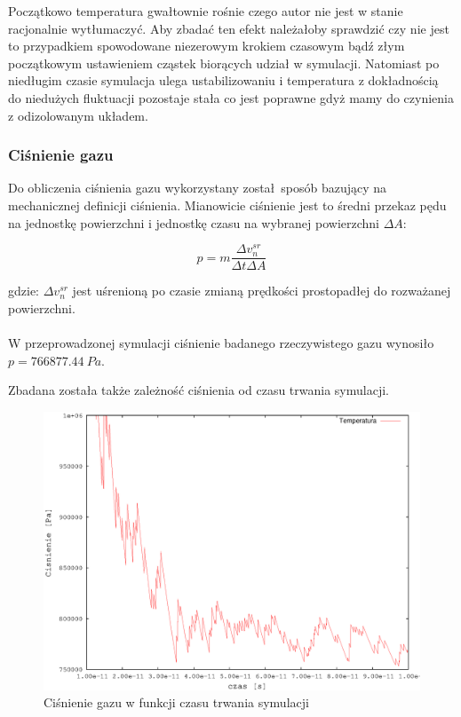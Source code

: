 \documentclass[a4paper,10pt]{article}
\begin{document}
Początkowo temperatura gwałtownie rośnie czego autor nie jest w stanie racjonalnie wytłumaczyć. Aby zbadać ten efekt należałoby sprawdzić czy nie jest to przypadkiem spowodowane niezerowym krokiem czasowym bądź złym początkowym ustawieniem cząstek biorących udział w symulacji. Natomiast po niedługim czasie symulacja ulega ustabilizowaniu i temperatura z dokładnością do niedużych fluktuacji pozostaje stała co jest poprawne gdyż mamy do czynienia z odizolowanym układem.

\subsubsection{Ciśnienie gazu}

Do obliczenia ciśnienia gazu wykorzystany został sposób bazujący na mechanicznej definicji ciśnienia. Mianowicie ciśnienie jest to średni przekaz pędu na jednostkę powierzchni i jednostkę czasu na wybranej powierzchni $\Delta A$:

\begin{equation}\label{cisnienie:1}
p = m \frac{\Delta v_n^{sr}}{\Delta t \Delta A}
\end{equation}

gdzie: $\Delta v_n^{sr}$ jest uśrenioną po czasie zmianą prędkości prostopadłej do rozważanej powierzchni.
\\
\\
W przeprowadzonej symulacji ciśnienie badanego rzeczywistego gazu wynosiło $p=766877.44\ Pa$.

Zbadana została także zależność ciśnienia od czasu trwania symulacji.

\begin{figure}[h]
\begin{center}
\includegraphics[scale=0.6]{wyniki/simulation-cis.eps}
\caption{Ciśnienie gazu w funkcji czasu trwania symulacji}
\label{pic:simulation}
\end{center}
\end{figure}
\FloatBarrier
\end{document}
